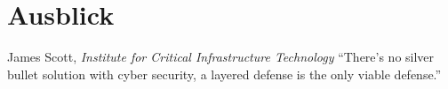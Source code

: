 \section{Ausblick}\label{sec:ausblick}

\begin{chapquote}{James Scott, \textit{Institute for Critical Infrastructure Technology}}
``There’s no silver bullet solution with cyber security, a layered defense is the only viable defense.''
\end{chapquote}

\lipsum[1-4]
\clearpage